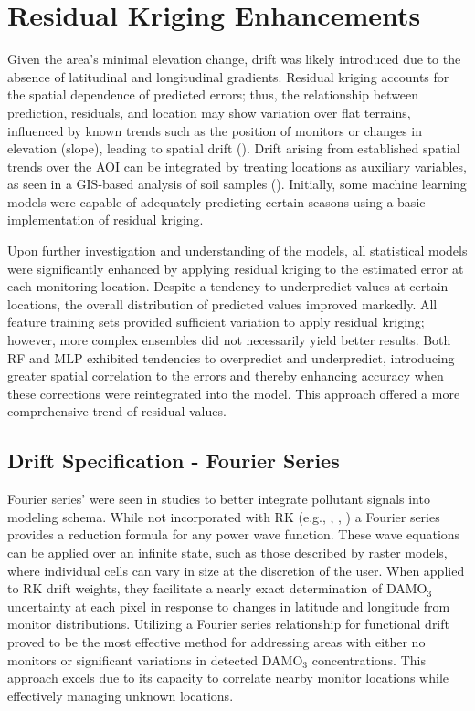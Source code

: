\section{Residual Kriging Enhancements} \label{rlts:rkfinal} Given the area's minimal elevation change, drift was likely introduced due to the absence of latitudinal and longitudinal gradients. Residual kriging accounts for the spatial dependence of predicted errors; thus, the relationship between prediction, residuals, and location may show variation over flat terrains, influenced by known trends such as the position of monitors or changes in elevation (slope), leading to spatial drift (\cite{oliver_tutorial_2014}). Drift arising from established spatial trends over the AOI can be integrated by treating locations as auxiliary variables, as seen in a GIS-based analysis of soil samples (\cite{anand_gis-based_2021}). Initially, some machine learning models were capable of adequately predicting certain seasons using a basic implementation of residual kriging. 

Upon further investigation and understanding of the models, all statistical models were significantly enhanced by applying residual kriging to the estimated error at each monitoring location. Despite a tendency to underpredict values at certain locations, the overall distribution of predicted values improved markedly. All feature training sets provided sufficient variation to apply residual kriging; however, more complex ensembles did not necessarily yield better results. Both RF and MLP exhibited tendencies to overpredict and underpredict, introducing greater spatial correlation to the errors and thereby enhancing accuracy when these corrections were reintegrated into the model. This approach offered a more comprehensive trend of residual values. 
\subsection{Drift Specification - Fourier Series} \label{rlts:driftres} Fourier series' were seen in studies to better integrate pollutant signals into modeling schema. While not incorporated with RK (e.g., \cite{flood_evaluating_2024}, \cite{kumar_integrated_2015}, \cite{plocoste_temporal_2017}) a Fourier series provides a reduction formula for any power wave function. These wave equations can be applied over an infinite state, such as those described by raster models, where individual cells can vary in size at the discretion of the user. When applied to RK drift weights, they facilitate a nearly exact determination of DAMO$_3$ uncertainty at each pixel in response to changes in latitude and longitude from monitor distributions. Utilizing a Fourier series relationship for functional drift proved to be the most effective method for addressing areas with either no monitors or significant variations in detected DAMO$_3$ concentrations. This approach excels due to its capacity to correlate nearby monitor locations while effectively managing unknown locations. 

